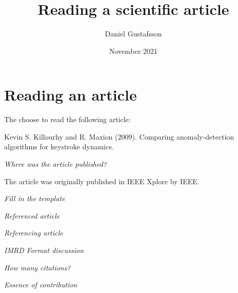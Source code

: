 \documentclass[11pt, a4paper]{article}
\title{Reading a scientific article}
\author{Daniel Gustafsson}
\date{November 2021}
\begin{document}
\maketitle

\section{Reading an article}
The choose to read the following article:

Kevin S. Killourhy and R. Maxion (2009). Comparing anomaly-detection algorithms for keystroke dynamics.

\textit{Where was the article published?}

The article was originally published in IEEE Xplore by IEEE.

\textit{Fill in the template}


\textit{Referenced article}


\textit{Referencing article}


\textit{IMRD Format discussion}


\textit{How many citations?}


\textit{Essence of contribution}
\end{document}
